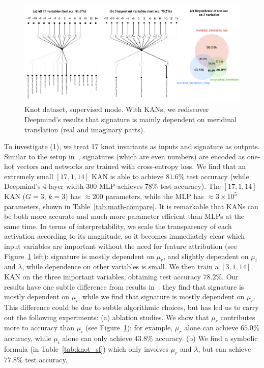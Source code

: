 \documentclass{article}
\numberwithin{equation}{section}
\numberwithin{figure}{section}
\begin{document}
\begin{figure}[t]
    \centering\includegraphics[width=1.0\linewidth]{figs/math.png}
    \caption{Knot dataset, supervised mode. With KANs, we rediscover Deepmind's results that signature is mainly dependent on meridinal translation (real and imaginary parts).}
    \label{fig:knot-supervised}
\end{figure}
  

To investigate (1), we treat 17 knot invariants as inputs and signature as outputs. Similar to the setup in~\cite{davies2021advancing}, signatures (which are even numbers) are encoded as one-hot vectors and networks are trained with cross-entropy loss. We find that an extremely small $[17,1,14]$ KAN is able to achieve $81.6\%$ test accuracy (while Deepmind's 4-layer width-300 MLP achieves 78\% test accuracy). The $[17,1,14]$ KAN ($G=3$, $k=3$) has $\approx 200$ parameters, while the MLP has $\approx 3\times 10^5$ parameters, shown in Table~\ref{tab:math-compare}. It is remarkable that KANs can be both more accurate and much more parameter efficient than MLPs at the same time. In terms of interpretability, we scale the transparency of each activation according to its magnitude, so it becomes immediately clear which input variables are important without the need for feature attribution (see Figure~\ref{fig:knot-supervised} left): signature is mostly dependent on $\mu_r$, and slightly dependent on $\mu_i$ and $\lambda$, while dependence on other variables is small. We then train a $[3,1,14]$ KAN on the three important variables, obtaining test accuracy $78.2\%$. Our results have one subtle difference from results in~\cite{davies2021advancing}: they find that signature is mostly dependent on $\mu_i$, while we find that signature is mostly dependent on $\mu_r$. This difference could be due to subtle algorithmic choices, but has led us to carry out the following experiments: (a) ablation studies. We show that $\mu_r$ contributes more to accuracy than $\mu_i$ (see Figure~\ref{fig:knot-supervised}): for example, $\mu_r$ alone can achieve $65.0\%$ accuracy, while $\mu_i$ alone can only achieve $43.8\%$ accuracy. (b) We find a symbolic formula (in Table~\ref{tab:knot_sf}) which only involves $\mu_r$ and $\lambda$, but can achieve $77.8\%$ test accuracy.
\end{document}
